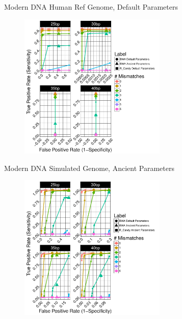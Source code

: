 \documentclass{beamer}
\begin{document}
\begin{frame}{\small{Modern DNA Human Ref Genome, Default Parameters}}
	
	\begin{figure}[H]
		\centering
		\includegraphics[width=7cm]{pics/f_DS6_emp.pdf}
		
	\end{figure}

\end{frame}

\begin{frame}{\small{Modern DNA Simulated Genome, Ancient Parameters}}
	\begin{figure}[H]
		\centering
		\includegraphics[width=7cm]{pics/f_DS8_emp.pdf}
		
	\end{figure}

\end{frame}
\end{document}
